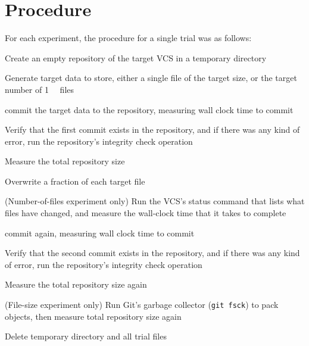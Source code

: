 \section{Procedure}

For each experiment, the procedure for a single trial was as follows:

\begin{tight_enumerate}

    \item Create an empty repository of the target \gls{VCS} in a temporary
        directory

    \item Generate target data to store, either a single file of the target
        size, or the target number of \SI{1}{\kibi\byte} files

    \item \Gls{commit} the target data to the repository, measuring wall clock
        time to \gls{commit}

    \item Verify that the first \gls{commit} exists in the repository, and if
        there was any kind of error, run the repository's integrity check
        operation

    \item Measure the total repository size

    \item Overwrite a fraction of each target file

    \item (Number-of-files experiment only) Run the \gls{VCS}'s status command
        that lists what files have changed, and measure the wall-clock time that
        it takes to complete

    \item \Gls{commit} again, measuring wall clock time to \gls{commit}

    \item Verify that the second \gls{commit} exists in the repository, and if
        there was any kind of error, run the repository's integrity check
        operation

    \item Measure the total repository size again

    \item (File-size experiment only) Run Git's garbage collector
        (\lstinline{git fsck}) to pack objects, then measure total repository
        size again

    \item Delete temporary directory and all trial files

\end{tight_enumerate}

